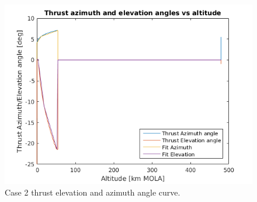 \begin{figure}[H]
\centering
\includegraphics[width=0.7 \textwidth]{figures/verification/case2/thrustAzimuthAndElevationDerivedFromCase2Version2.png}
\caption{Case 2 thrust elevation and azimuth angle curve.}
\label{fig:thrustAzimuthAndElevationDerivedFromCase2Version2}
\end{figure}


%
%


